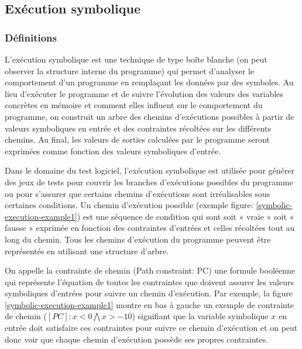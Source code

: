 \subsection{Exécution symbolique}

\subsubsection*{Définitions}
L'exécution symbolique\cite{symbolic-execution-by-king} est une technique de type boîte blanche (on peut observer la structure interne du programme) qui permet d'analyser le comportement d'un programme en remplaçant les données par des symboles. 
Au lieu d'exécuter le programme et de suivre l'évolution des valeurs des variables concrètes en mémoire et comment elles influent sur le comportement du programme, on construit un arbre des chemins d'exécutions possibles à partir de valeurs symboliques en entrée et des contraintes récoltées sur les différents chemins.
Au final, les valeurs de sorties calculées par le programme seront exprimées comme fonction des valeurs symboliques d'entrée.

Dans le domaine du test logiciel, l'exécution symbolique est utilisée pour générer des jeux de tests pour couvrir les branches d'exécutions possibles du programme ou pour s'assurer que certains chemins d'exécutions sont irréalisables sous certaines conditions.
Un chemin d'exécution possible (exemple figure: \ref{symbolic-execution-example1}) est une séquence de condition qui sont soit « vraie » soit « fausse » exprimée en fonction des contraintes d'entrées et celles récoltées tout au long du chemin. Tous les chemins d'exécution du programme peuvent être représentés en utilisant une structure d'arbre.

On appelle la contrainte de chemin (Path constraint: PC) une formule booléenne qui représente l'équation de toutes les contraintes que doivent assurer les valeurs symboliques d'entrées pour suivre un chemin d'exécution. Par exemple, la figure \ref{symbolic-execution-example1} montre en bas à gauche un exemple de contrainte de chemin ($[PC]: x < 0 \bigwedge x > -10$) signifiant que la variable symbolique $x$ en entrée doit satisfaire ces contraintes pour suivre ce chemin d'exécution et on peut donc voir que chaque chemin d'exécution possède ses propres contraintes.\\

